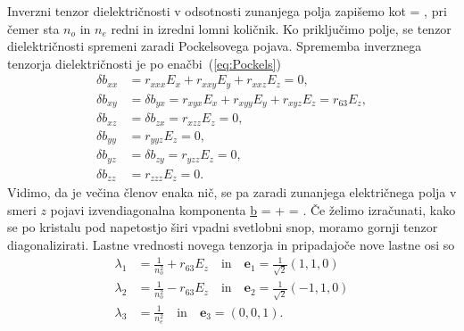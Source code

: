 Inverzni tenzor dielektričnosti v odsotnosti zunanjega polja zapišemo kot
\beq
\underline{} = 
,
\label{7.8}
\eeq
pri čemer sta $n_o$ in $n_e$ redni in izredni lomni količnik. Ko priključimo 
polje, se tenzor dielektričnosti spremeni zaradi Pockelsovega pojava. Sprememba
inverznega tenzorja dielektričnosti je po enačbi~(\ref{eq:Pockels})
\begin{align}
\delta b_{xx} & =r_{xxx}E_x + r_{xxy}E_y + r_{xxz}E_z = 0,\nonumber \\
\delta b_{xy} & = \delta b_{yx} = r_{xyx}E_x + r_{xyy}E_y + r_{xyz}E_z = r_{63}E_z,\nonumber\\
\delta b_{xz} & = \delta b_{zx} =r_{xzz}E_z = 0,\nonumber\\
\delta b_{yy} & =r_{yyz}E_z = 0,\nonumber\\
\delta b_{yz} & = \delta b_{zy} =r_{yzz}E_z = 0,\nonumber\\
\delta b_{zz} & =r_{zzz}E_z = 0.
\end{align}
Vidimo, da je večina členov enaka nič, se pa zaradi zunanjega električnega
polja v smeri $z$ pojavi izvendiagonalna komponenta 
\beq
\underline{b} = 
 +  = .
\label{7.8a}
\eeq
Če želimo izračunati, kako se po kristalu pod napetostjo širi vpadni svetlobni
snop, moramo gornji tenzor diagonalizirati. Lastne vrednosti novega tenzorja
in pripadajoče nove lastne osi so
\begin{align}
\lambda_1 &= \frac{1}{n_o^2}+ r_{63}E_z \quad \mathrm{in} \quad \mathbf{e}_1 = \frac{1}{\sqrt{2}}(1,1,0)\\
\lambda_2 &= \frac{1}{n_o^2}- r_{63}E_z \quad \mathrm{in} \quad \mathbf{e}_2 = \frac{1}{\sqrt{2}}(-1,1,0)\\
\lambda_3 &= \frac{1}{n_e^2} \quad \mathrm{in} \quad \mathbf{e}_3 = (0,0,1).
\end{align}
